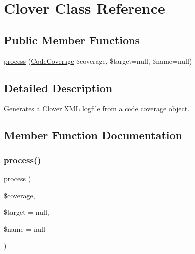 \hypertarget{class_sebastian_bergmann_1_1_code_coverage_1_1_report_1_1_clover}{}\section{Clover Class Reference}
\label{class_sebastian_bergmann_1_1_code_coverage_1_1_report_1_1_clover}
\subsection*{Public Member Functions}
\begin{DoxyCompactItemize}
\item 
\mbox{\hyperlink{class_sebastian_bergmann_1_1_code_coverage_1_1_report_1_1_clover_af2f58c151701fd52866cfa6150b3fb90}{process}} (\mbox{\hyperlink{class_sebastian_bergmann_1_1_code_coverage_1_1_code_coverage}{Code\+Coverage}} \$coverage, \$target=null, \$name=null)
\end{DoxyCompactItemize}


\subsection{Detailed Description}
Generates a \mbox{\hyperlink{class_sebastian_bergmann_1_1_code_coverage_1_1_report_1_1_clover}{Clover}} X\+ML logfile from a code coverage object. 

\subsection{Member Function Documentation}
\mbox{\label{class_sebastian_bergmann_1_1_code_coverage_1_1_report_1_1_clover_af2f58c151701fd52866cfa6150b3fb90}} 
\subsubsection{\texorpdfstring{process()}{process()}}
{\footnotesize\ttfamily process (\begin{DoxyParamCaption}\item[{\mbox{\hyperlink{class_sebastian_bergmann_1_1_code_coverage_1_1_code_coverage}{Code\+Coverage}}}]{\$coverage,  }\item[{}]{\$target = {\ttfamily null},  }\item[{}]{\$name = {\ttfamily null} }\end{DoxyParamCaption})}



